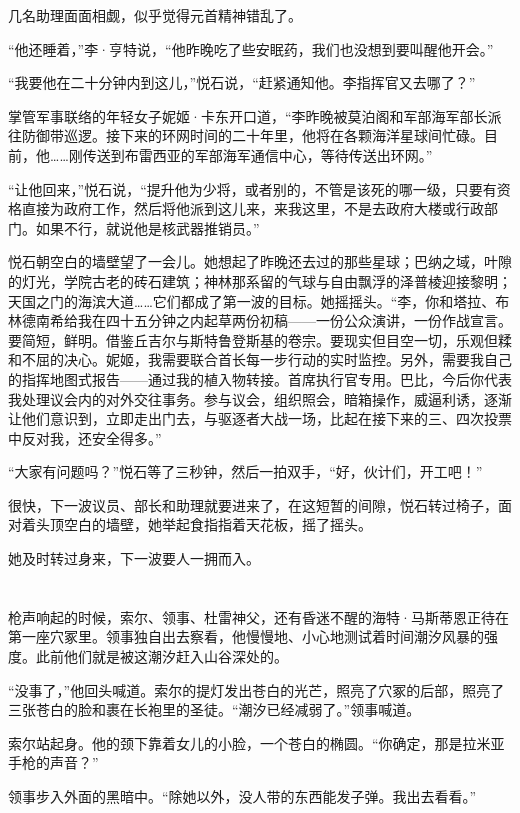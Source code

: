 \documentclass[AutoFakeBold=true]{book}
\begin{document}
几名助理面面相觑，似乎觉得元首精神错乱了。

``他还睡着，''李·亨特说，``他昨晚吃了些安眠药，我们也没想到要叫醒他开会。''

``我要他在二十分钟内到这儿，''悦石说，``赶紧通知他。李指挥官又去哪了？''

掌管军事联络的年轻女子妮姬·卡东开口道，``李昨晚被莫泊阁和军部海军部长派往防御带巡逻。接下来的环网时间的二十年里，他将在各颗海洋星球间忙碌。目前，他……刚传送到布雷西亚的军部海军通信中心，等待传送出环网。''

``让他回来，''悦石说，``提升他为少将，或者别的，不管是该死的哪一级，只要有资格直接为政府工作，然后将他派到这儿来，来我这里，不是去政府大楼或行政部门。如果不行，就说他是核武器推销员。''

悦石朝空白的墙壁望了一会儿。她想起了昨晚还去过的那些星球；巴纳之域，叶隙的灯光，学院古老的砖石建筑；神林那系留的气球与自由飘浮的泽普棱迎接黎明；天国之门的海滨大道……它们都成了第一波的目标。她摇摇头。``李，你和塔拉、布林德南希给我在四十五分钟之内起草两份初稿——一份公众演讲，一份作战宣言。要简短，鲜明。借鉴丘吉尔与斯特鲁登斯基的卷宗。要现实但目空一切，乐观但糅和不屈的决心。妮姬，我需要联合首长每一步行动的实时监控。另外，需要我自己的指挥地图式报告——通过我的植入物转接。首席执行官专用。巴比，今后你代表我处理议会内的对外交往事务。参与议会，组织照会，暗箱操作，威逼利诱，逐渐让他们意识到，立即走出门去，与驱逐者大战一场，比起在接下来的三、四次投票中反对我，还安全得多。''

``大家有问题吗？''悦石等了三秒钟，然后一拍双手，``好，伙计们，开工吧！''

很快，下一波议员、部长和助理就要进来了，在这短暂的间隙，悦石转过椅子，面对着头顶空白的墙壁，她举起食指指着天花板，摇了摇头。

她及时转过身来，下一波要人一拥而入。

\chapter{}

枪声响起的时候，索尔、领事、杜雷神父，还有昏迷不醒的海特·马斯蒂恩正待在第一座穴冢里。领事独自出去察看，他慢慢地、小心地测试着时间潮汐风暴的强度。此前他们就是被这潮汐赶入山谷深处的。

``没事了，''他回头喊道。索尔的提灯发出苍白的光芒，照亮了穴冢的后部，照亮了三张苍白的脸和裹在长袍里的圣徒。``潮汐已经减弱了。''领事喊道。

索尔站起身。他的颈下靠着女儿的小脸，一个苍白的椭圆。``你确定，那是拉米亚手枪的声音？''

领事步入外面的黑暗中。``除她以外，没人带的东西能发子弹。我出去看看。''
\end{document}
